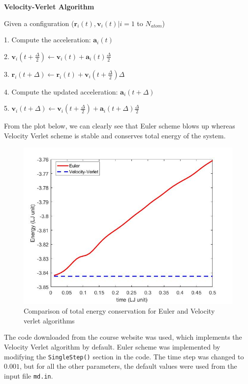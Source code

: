 \documentclass[11pt, oneside]{article}   	%
\begin{document}
\begin{framed}
	\textbf{Velocity-Verlet Algorithm}
	
	Given a configuration ($\boldsymbol{r}_i(t), \boldsymbol{v}_i(t) | i = 1$ to $N_{atom}$)
	
	1. Compute the acceleration: $\boldsymbol{a}_i(t)$
	
	2. $\boldsymbol{v}_i(t + \frac{\Delta}{2}) \leftarrow \boldsymbol{v}_i(t) + \boldsymbol{a}_i(t) \frac{\Delta}{2} $
	
	3. $\boldsymbol{r}_i(t + \Delta) \leftarrow \boldsymbol{r}_i(t) + \boldsymbol{v}_i(t+\frac{\Delta}{2}) \Delta $
	
	4. Compute the updated acceleration: $\boldsymbol{a}_i(t + \Delta)$
	
	5. $\boldsymbol{v}_i(t + \Delta) \leftarrow \boldsymbol{v}_i(t+\frac{\Delta}{2}) + \boldsymbol{a}_i(t +\Delta) \frac{\Delta}{2} $
\end{framed}
From the plot below, we can clearly see that Euler scheme blows up whereas Velocity Verlet scheme is stable and conserves total energy of the system.
	\begin{figure}[!htbp]
	\centering
	\includegraphics[scale=0.43]{AlgorithmVariants_EnergyPlots.jpg}
	\caption{Comparison of total energy conservation for Euler and Velocity verlet algorithms}
	\end{figure}
	
The code downloaded from the course website was used, which implements the Velocity Verlet algorithm by default. Euler scheme was implemented by modifying the \texttt{SingleStep()} section in the code. The time step was changed to $0.001$, but for all the other parameters, the default values were used from the input file \texttt{md.in}. 
\end{document}
